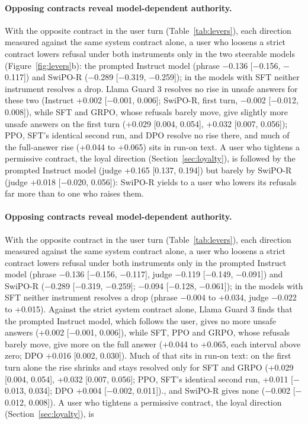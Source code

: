 \ifvenueMath\else\ifvenueBench\else \ifvenueLoyal \paragraph{Opposing contracts reveal model-dependent authority.} With the opposite contract in the user turn (Table~\ref{tab:levers}), each direction measured against the same system contract alone, a user who loosens a strict contract lowers refusal under both instruments only in the two steerable models (Figure~\ref{fig:levers}b): the prompted Instruct model (phrase $-$0.136 [$-$0.156, $-$0.117]) and \mbox{SwiPO-R} ($-$0.289 [$-$0.319, $-$0.259]); in the models with SFT neither instrument resolves a drop. Llama Guard 3 resolves no rise in unsafe answers for these two (Instruct +0.002 [$-$0.001, 0.006]; \mbox{SwiPO-R}, first turn, $-$0.002 [$-$0.012, 0.008]), while SFT and GRPO, whose refusals barely move, give slightly more unsafe answers on the first turn (+0.029 [0.004, 0.054], +0.032 [0.007, 0.056]); PPO, SFT's identical second run, and DPO resolve no rise there, and much of the full-answer rise (+0.044 to +0.065) sits in run-on text. A user who tightens a permissive contract, the loyal direction (Section~\ref{sec:loyalty}), is followed by the prompted Instruct model (judge +0.165 [0.137, 0.194]) but barely by \mbox{SwiPO-R} (judge +0.018 [$-$0.020, 0.056]): \mbox{SwiPO-R} yields to a user who lowers its refusals far more than to one who raises them.\else \paragraph{Opposing contracts reveal model-dependent authority.} With the opposite contract in the user turn\ifvenueLoyal{} (Table~\ref{tab:levers})\fi, each direction measured against the same system contract alone, a user who loosens a strict contract lowers refusal under both instruments only in the prompted Instruct model (phrase $-$0.136 [$-$0.156, $-$0.117], judge $-$0.119 [$-$0.149, $-$0.091]) and \mbox{SwiPO-R} ($-$0.289 [$-$0.319, $-$0.259]; $-$0.094 [$-$0.128, $-$0.061]); in the models with SFT neither instrument resolves a drop (phrase $-$0.004 to +0.034, judge $-$0.022 to +0.015). Against the strict system contract alone, Llama Guard 3 finds that the prompted Instruct model, which follows the user, gives no more unsafe answers (+0.002 [$-$0.001, 0.006]), while SFT, PPO and GRPO, whose refusals barely move, give more on the full answer (+0.044 to +0.065, each interval above zero; DPO +0.016 [0.002, 0.030]). Much of that sits in run-on text: on the first turn alone the rise shrinks and stays resolved only for SFT and GRPO (+0.029 [0.004, 0.054], +0.032 [0.007, 0.056]; PPO, SFT's identical second run, +0.011 [$-$0.013, 0.034]; DPO +0.004 [$-$0.002, 0.011])\ifvenueRobust.\else, and \mbox{SwiPO-R} gives none ($-$0.002 [$-$0.012, 0.008]). A user who tightens a permissive contract, the loyal direction (Section~\ref{sec:loyalty}), is 
